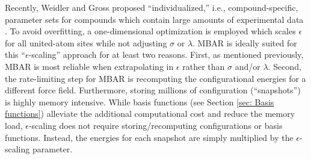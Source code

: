 \documentclass[journal=jced,manuscript=article]{achemso}
\begin{document}
Recently, Weidler and Gross proposed ``individualized,'' i.e., compound-specific, parameter sets for compounds which contain large amounts of experimental data \cite{Weidler2018}. To avoid overfitting, a one-dimensional optimization is employed which scales $\epsilon$ for all united-atom sites while not adjusting $\sigma$ or $\lambda$. MBAR is ideally suited for this ``$\epsilon$-scaling'' approach for at least two reasons. First, as mentioned previously, MBAR is most reliable when extrapolating in $\epsilon$ rather than $\sigma$ and/or $\lambda$. Second, the rate-limiting step for MBAR is recomputing the configurational energies for a different force field. Furthermore, storing millions of configuration (``snapshots'') is highly memory intensive. While basis functions (see Section \ref{sec: Basis functions}) alleviate the additional computational cost and reduce the memory load, $\epsilon$-scaling does not require storing/recomputing configurations or basis functions. Instead, the energies for each snapshot are simply multiplied by the $\epsilon$-scaling parameter.  



\end{document}
